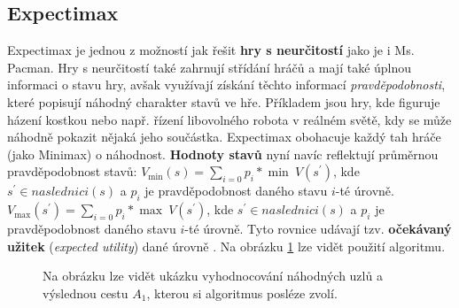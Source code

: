 \subsection{Expectimax}
Expectimax \cite{mas} je jednou z možností jak řešit \textbf{hry s neurčitostí} jako je i Ms. Pacman. Hry s neurčitostí také zahrnují střídání hráčů a mají také úplnou informaci o stavu hry, avšak využívají získání těchto informací \textit{pravděpodobnosti}, které popisují náhodný charakter stavů ve hře. Příkladem jsou hry, kde figuruje házení kostkou nebo např. řízení libovolného robota v reálném světě, kdy se může náhodně pokazit nějaká jeho součástka. Expectimax obohacuje každý tah hráče (jako Minimax) o náhodnost. \textbf{Hodnoty stavů} nyní navíc reflektují průměrnou pravděpodobnost stavů: \newline \newline
$V_{\min}(s) = \sum_{i=0} p_i * \min \: V(s^\prime)$, kde
\newline $s^\prime \in naslednici(s)$ a $p_i$ je pravděpodobnost daného stavu $i$-té úrovně.
\newline
\newline
$V_{\max}(s^\prime) = \sum_{i=0} p_i * \max \: V(s^\prime)$, kde 
\newline
$s^\prime \in naslednici(s)$ a $p_i$ je pravděpodobnost daného stavu $i$-té úrovně.
\newline
\newline
Tyto rovnice udávají tzv. \textbf{očekávaný užitek} (\textit{expected utility}) dané úrovně \cite{mas}. Na obrázku \ref{img:expectimax} lze vidět použití algoritmu.

\begin{figure}[h]
\begin{center}
	\caption{Na obrázku lze vidět ukázku vyhodnocování náhodných uzlů a výslednou cestu \boldmath$A_1$, kterou si algoritmus posléze zvolí.}
	\label{img:expectimax}
\end{center}
\end{figure}

